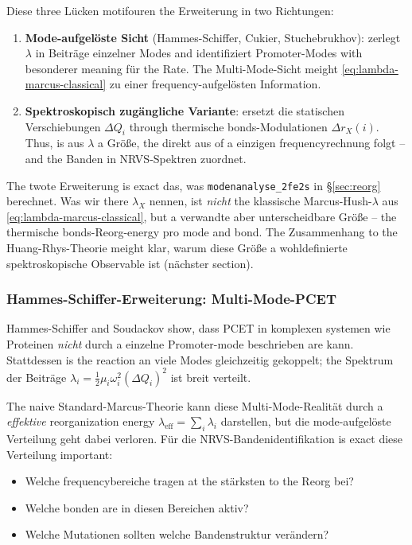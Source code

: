 \documentclass[11pt,a4paper,twoside]{article}
\theoremstyle{remark}
\begin{document}
Diese three Lücken motifouren the Erweiterung in two Richtungen:

\begin{enumerate}
  \item \textbf{Mode-aufgel\"oste Sicht} (Hammes-Schiffer, Cukier,
        Stuchebrukhov): zerlegt $\lambda$ in Beitr\"age einzelner
        Modes and identifiziert Promoter-Modes with besonderer
        meaning f\"ur the Rate. The Multi-Mode-Sicht meight
        \eqref{eq:lambda-marcus-classical} zu einer
        frequency-aufgel\"osten Information.
  \item \textbf{Spektroskopisch zug\"angliche Variante}: ersetzt die
        statischen Verschiebungen $\Delta Q_i$ through thermische
        bonds-Modulationen $\Delta r_X(i)$. Thus, is aus
        $\lambda$ a Gr\"o{\ss}e, the direkt aus of a einzigen
        frequencyrechnung folgt -- and the Banden in NRVS-Spektren
        zuordnet.
\end{enumerate}

The twote Erweiterung is exact das, was \texttt{modenanalyse\_2fe2s}
in \S\ref{sec:reorg} berechnet. Was wir there $\lambda_X$ nennen, ist
\emph{nicht} the klassische Marcus-Hush-$\lambda$ aus
\eqref{eq:lambda-marcus-classical}, but a verwandte aber
unterscheidbare Gr\"o{\ss}e -- the thermische bonds-Reorg-energy pro
mode and bond. The Zusammenhang to the Huang-Rhys-Theorie meight klar,
warum diese Gr\"o{\ss}e a wohldefinierte spektroskopische Observable
ist (n\"achster section).

\subsubsection*{Hammes-Schiffer-Erweiterung: Multi-Mode-PCET}

Hammes-Schiffer and Soudackov \cite{HammesSchifferSoudackov2008}
show, dass PCET in komplexen systemen wie Proteinen \emph{nicht}
durch a einzelne Promoter-mode beschrieben are kann. Stattdessen
is the reaction an viele Modes gleichzeitig gekoppelt; the Spektrum
der Beitr\"age $\lambda_i = \tfrac{1}{2}\mu_i\omega_i^2(\Delta Q_i)^2$
ist breit verteilt.

The naive Standard-Marcus-Theorie kann diese Multi-Mode-Realit\"at
durch a \emph{effektive} reorganization energy
$\lambda_\text{eff} = \sum_i \lambda_i$ darstellen, but die
mode-aufgel\"oste Verteilung geht dabei verloren. F\"ur die
NRVS-Bandenidentifikation is exact diese Verteilung important:

\begin{itemize}\setlength{\itemsep}{0pt}
  \item Welche frequencybereiche tragen at the st\"arksten to the Reorg bei?
  \item Welche bonden are in diesen Bereichen aktiv?
  \item Welche Mutationen sollten welche Bandenstruktur ver\"andern?
\end{itemize}
\end{document}

